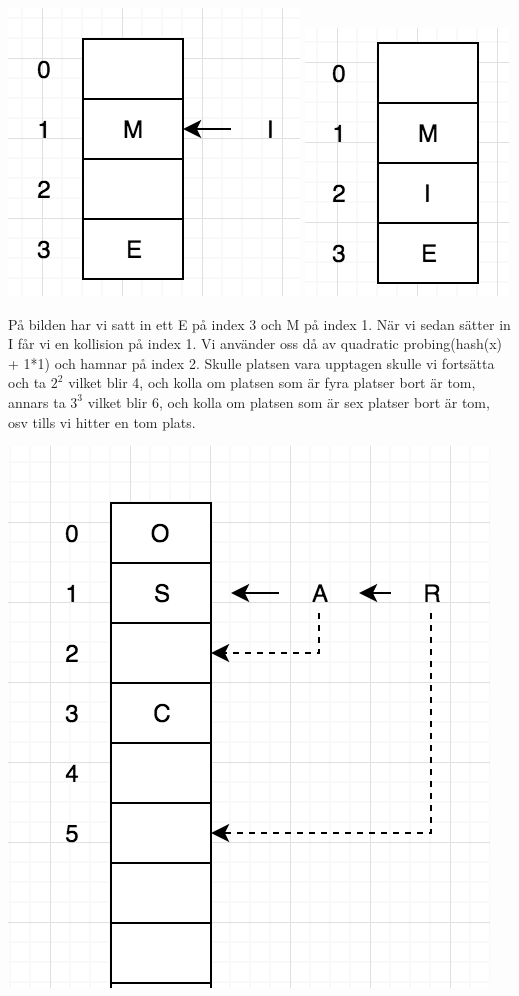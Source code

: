 \documentclass[a5paper,10pt,oneside]{article}
\begin{document}
 \includegraphics[scale=1]{Qua2}
 \includegraphics[scale=1]{Qua1}
 
 På bilden har vi satt in ett E på index 3 och M på index 1. När vi sedan sätter in I får vi en kollision på index 1. Vi använder oss då av quadratic probing(hash(x) + 1*1) och hamnar på index 2. Skulle platsen vara upptagen skulle vi fortsätta och ta $2^2$ vilket blir 4, och kolla om platsen som är fyra platser bort är tom, annars ta $3^3$ vilket blir 6, och kolla om platsen som är sex platser bort är tom, osv tills vi hitter en tom plats.
 
\includegraphics[scale=1]{quad}
\end{document}

